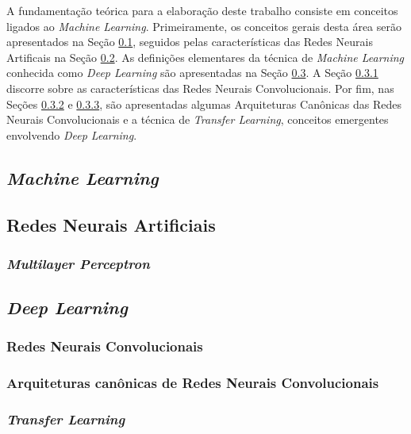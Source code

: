 A fundamentação teórica para a elaboração deste trabalho consiste em conceitos ligados ao \emph{Machine Learning}. Primeiramente, os conceitos gerais desta área serão apresentados na Seção \ref{subsec:ml}, seguidos pelas características das Redes Neurais Artificais na Seção \ref{subsec:rna}. As definições elementares da técnica de \emph{Machine Learning} conhecida como \emph{Deep Learning} são apresentadas na Seção \ref{subsec:dl}. A Seção \ref{subsubsec:cnns} discorre sobre as características das Redes Neurais Convolucionais. Por fim, nas Seções \ref{subsubsec:arq-cnns} e \ref{subsubsec:transfer}, são apresentadas algumas Arquiteturas Canônicas das Redes Neurais Convolucionais e a técnica de \emph{Transfer Learning}, conceitos emergentes envolvendo \emph{Deep Learning}.


\subsection{\emph{Machine Learning}}
\label{subsec:ml}

\subsection{Redes Neurais Artificiais}
\label{subsec:rna}

\subsubsection{\emph{Multilayer Perceptron}}
\label{subsubsec:mlp}


\subsection{\emph{Deep Learning}}
\label{subsec:dl}

\subsubsection{Redes Neurais Convolucionais}
\label{subsubsec:cnns}

\subsubsection{Arquiteturas canônicas de Redes Neurais Convolucionais}
\label{subsubsec:arq-cnns}

\subsubsection{\emph{Transfer Learning}}
\label{subsubsec:transfer}